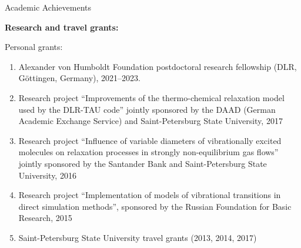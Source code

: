 \documentclass{resume} %
\begin{document}
\begin{rSection}{Academic Achievements}



{\bf Research and travel grants:}


Personal grants:
\begin{enumerate}

    \item Alexander von Humboldt Foundation postdoctoral research fellowship (DLR,  G\"{o}ttingen, Germany), 2021--2023.
    \item Research project ``Improvements of the thermo-chemical relaxation model used by the DLR-TAU code'' jointly sponsored by the DAAD (German Academic Exchange Service) and Saint-Petersburg State University, 2017
    \item Research project ``Influence of variable diameters of vibrationally excited molecules on relaxation processes in strongly non-equilibrium gas flows'' jointly sponsored by the Santander Bank and Saint-Petersburg State University, 2016
    \item Research project ``Implementation of models of vibrational transitions in direct simulation methods'', sponsored by the Russian Foundation for Basic Research, 2015
    \item Saint-Petersburg State University travel grants (2013, 2014, 2017)

\end{enumerate}



\end{rSection}
\end{document}
